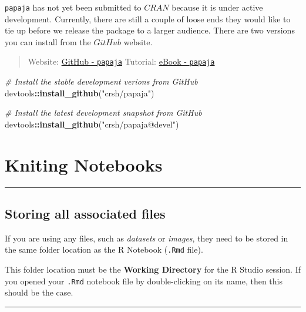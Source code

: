 \documentclass[]{book}
\newenvironment{Shaded}{\begin{snugshade}}{\end{snugshade}}
\newcommand{\KeywordTok}[1]{\textcolor[rgb]{0.13,0.29,0.53}{\textbf{#1}}}
\newcommand{\StringTok}[1]{\textcolor[rgb]{0.31,0.60,0.02}{#1}}
\newcommand{\CommentTok}[1]{\textcolor[rgb]{0.56,0.35,0.01}{\textit{#1}}}
\newcommand{\OperatorTok}[1]{\textcolor[rgb]{0.81,0.36,0.00}{\textbf{#1}}}
\newcommand{\NormalTok}[1]{#1}
\theoremstyle{definition}
\theoremstyle{definition}
\theoremstyle{definition}
\theoremstyle{remark}
\begin{document}
\texttt{papaja} has not yet been submitted to \(CRAN\) because it is
under active development. Currently, there are still a couple of loose
ends they would like to tie up before we release the package to a larger
audience. There are two versions you can install from the \(GitHub\)
website.

\begin{quote}
Website: \href{https://github.com/crsh/papaja}{GitHub - \texttt{papaja}}
Tutorial: \href{https://crsh.github.io/papaja_man/}{eBook -
\texttt{papaja}}
\end{quote}

\begin{Shaded}
\begin{Highlighting}[]
\CommentTok{# Install the stable development verions from GitHub}
\NormalTok{devtools}\OperatorTok{::}\KeywordTok{install_github}\NormalTok{(}\StringTok{"crsh/papaja"}\NormalTok{)}

\CommentTok{# Install the latest development snapshot from GitHub}
\NormalTok{devtools}\OperatorTok{::}\KeywordTok{install_github}\NormalTok{(}\StringTok{"crsh/papaja@devel"}\NormalTok{)}
\end{Highlighting}
\end{Shaded}

\chapter{Kniting Notebooks}\label{kniting-notebooks}

\begin{center}\rule{0.5\linewidth}{\linethickness}\end{center}

\section{Storing all associated
files}\label{storing-all-associated-files}

If you are using any files, such as \emph{datasets} or \emph{images},
they need to be stored in the same folder location as the R Notebook
(\texttt{.Rmd} file).

This folder location must be the \textbf{Working Directory} for the R
Studio session. If you opened your \texttt{.Rmd} notebook file by
double-clicking on its name, then this should be the case.

\begin{center}\rule{0.5\linewidth}{\linethickness}\end{center}
\end{document}
